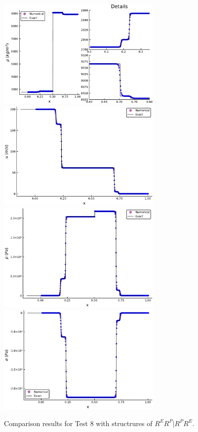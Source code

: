 \documentclass{article}
\numberwithin{equation}{section}
\numberwithin{table}{section}
\begin{document}
\begin{figure}
  \centering
  \includegraphics[width= 8cm] {case6rho.pdf}
  \includegraphics[width= 8cm] {case6u.pdf}
  \includegraphics[width= 8cm] {case6p.pdf}
  \includegraphics[width= 8cm] {case6sigma.pdf}

    \caption{Comparison results for Test 8 with structrures of $R^ER^P|R^PR^E$.  }
  \label{fig:case7}
\end{figure}
\end{document}
